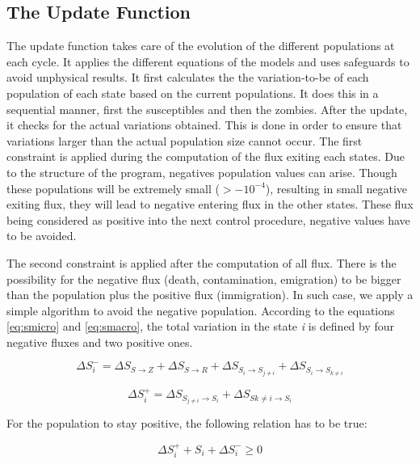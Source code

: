 \documentclass[11pt]{article} %
\begin{document}
\subsection{The Update Function}\indent

The update function takes care of the evolution of the different populations at each cycle. It applies the different equations of the models and uses safeguards to avoid unphysical results. It first calculates the the variation-to-be of each population of each state based on the current populations. It does this in a sequential manner, first the susceptibles and then the zombies. After the update, it checks for the actual variations obtained. This is done in order to ensure that variations larger than the actual population size cannot occur.
The first constraint is applied during the computation of the flux exiting each states. Due to the structure of the program, negatives population values can arise. Though these populations will be extremely small ($> - 10^{-4}$), resulting in small negative exiting flux, they will lead to negative entering flux in the other states. These flux being considered as positive into the next control procedure, negative values have to be avoided.

The second constraint is applied after the computation of all flux. There is the possibility for the negative flux (death, contamination, emigration) to be bigger than the population plus the positive flux (immigration). In such case, we apply a simple algorithm to avoid the negative population. According to the equations \eqref{eq:smicro} and \eqref{eq:smacro}, the total variation in the state \textit{i} is defined by four negative fluxes and two positive ones. 

\bigskip
\begin{equation} \label{eq:delta-}
\Delta S_i^- = \Delta S_{S\rightarrow Z} + \Delta S_{S\rightarrow R} + \Delta S_{S_i\rightarrow S_{j\neq i}} + \Delta S_{S_i\rightarrow S_{k\neq i}}
\end{equation}

\begin{equation} \label{eq:delta+}
\Delta S_i^+ = \Delta S_{S_{j\neq i}\rightarrow S_i} + \Delta S_{S{k\neq i}\rightarrow S_i}
\end{equation}
\bigskip

For the population to stay positive, the following relation has to be true:

\bigskip
\begin{equation} \label{eq:condition}
\Delta S_i^+ + S_i + \Delta S_i^- \geq 0
\end{equation}
\bigskip
\end{document}
